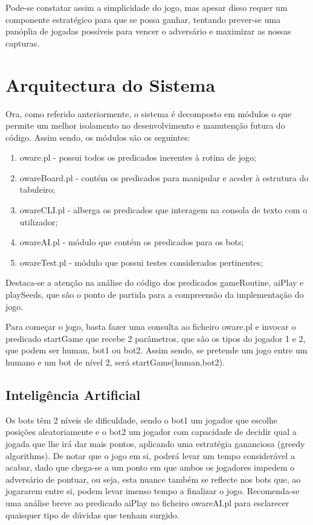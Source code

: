 \documentclass[15pt,a4paper]{article}
\begin{document}
Pode-se constatar assim a simplicidade do jogo, mas apesar disso requer um componente estratégico para que se possa ganhar, tentando prever-se uma panóplia de jogadas possíveis para vencer o adversário e maximizar as nossas capturas.

\section{Arquitectura do Sistema}
Ora, como referido anteriormente, o sistema é decomposto em módulos o que permite um melhor isolamento no desenvolvimento e manutenção futura do código. Assim sendo, os módulos são os seguintes:
\begin{enumerate}
  \item oware.pl - possui todos os predicados inerentes à rotina de jogo;
  \item owareBoard.pl - contém os predicados para manipular e aceder à estrutura do tabuleiro;
  \item owareCLI.pl - alberga os predicados que interagem na consola de texto com o utilizador;
  \item owareAI.pl - módulo que contém os predicados para os bots;
  \item owareTest.pl - módulo que possui testes considerados pertinentes;
\end{enumerate}

\indent Destaca-se a atenção na análise do código dos predicados gameRoutine, aiPlay e playSeeds, que são o ponto de partida para a compreensão da implementação do jogo.

\indent Para começar o jogo, basta fazer uma consulta ao ficheiro oware.pl e invocar o predicado startGame que recebe 2 parâmetros, que são os tipos do jogador 1 e 2, que podem ser human, bot1 ou bot2. Assim sendo, se pretende um jogo entre um humano e um bot de nível 2, será startGame(human,bot2). 

\subsection{Inteligência Artificial}
Os bots têm 2 níveis de dificuldade, sendo o bot1 um jogador que escolhe posições aleatoriamente e o bot2 um jogador com capacidade de decidir qual a jogada que lhe irá dar mais pontos, aplicando uma estratégia gananciosa (greedy algorithms).
De notar que o jogo em si, poderá levar um tempo considerável a acabar, dado que chega-se a um ponto em que ambos os jogadores impedem o adversário de pontuar, ou seja, esta nuance também se reflecte nos bots que, ao jogararem entre si, podem levar imenso tempo a finalizar o jogo. Recomenda-se uma análise breve ao predicado aiPlay no ficheiro owareAI.pl para esclarecer quaisquer tipo de dúvidas que tenham surgido.
\end{document}
